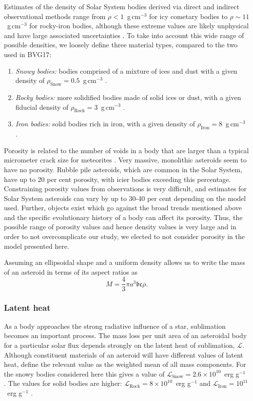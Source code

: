 \documentclass[fleqn,usenatbib]{mnras}
\newcommand{\gcm}{g\,cm$^{-3}$ }	%
\newcommand{\ergg}{erg g$^{-1}$ } %
\begin{document}
Estimates of the density of Solar System bodies derived via direct and indirect observational methods range from $\rho < 1$~\gcm for icy cometary bodies to $\rho \sim 11$~\gcm for rocky-iron bodies, although these extreme values are likely unphysical and have large associated uncertainties \citep{Carry2012}. 
To take into account this wide range of possible densities, we loosely define three material types, compared to the two used in BVG17:
\begin{enumerate}
    \item \textit{Snowy bodies:} bodies comprised of a mixture of ices and dust with a given density of $\rho_\text{Snow} = 0.5$~\gcm.
    \item \textit{Rocky bodies:} more solidified bodies made of solid ices or dust, with a given fiducial density of $\rho_\text{Rock} = 3$~\gcm.
    \item \textit{Iron bodies:} solid bodies rich in iron, with a given density of $\rho_\text{Iron} = 8$~\gcm.
\end{enumerate}

Porosity is related to the number of voids in a body that are larger than a typical micrometer crack size for meteorites \citep{Carry2012}.
Very massive, monolithic asteroids seem to have no porosity. 
Rubble pile asteroids, which are common in the Solar System, have up to 20 per cent porosity, with icier bodies exceeding this percentage. 
Constraining porosity values from observations is very difficult, and estimates for Solar System asteroids can vary by up to 30-40 per cent depending on the model used. 
Further, objects exist which go against the broad trends mentioned above and the specific evolutionary history of a body can affect its porosity.
Thus, the possible range of porosity values and hence density values is very large and in order to not overcomplicate our study, we elected to not consider porosity in the model presented here.


Assuming an ellipsoidal shape and a uniform density allows us to write the mass of an asteroid in terms of its aspect ratios as 
\begin{equation}
    \label{eq:asteroid_mass}
    M = \frac{4}{3} \pi a^3 \mathfrak{b} \mathfrak{c} \rho.
\end{equation}

\subsubsection{Latent heat} \label{subsubsec:ast_latentheat}
As a body approaches the strong radiative influence of a star, sublimation becomes an important process. 
The mass loss per unit area of an asteroidal body for a particular solar flux depends strongly on the latent heat of sublimation, $\mathcal{L}$.
Although constituent materials of an asteroid will have different values of latent heat, \cite{Brown2011} define the relevant value as the weighted mean of all mass components.
For the snowy bodies considered here this gives a value of $\mathcal{L}_\text{Snow} = 2.6 \times 10^{10}$~\ergg.
The values for solid bodies are higher: $\mathcal{L}_\text{Rock} = 8 \times 10^{10}$~\ergg and $\mathcal{L}_\text{Iron} = 10^{11}$~\ergg \citep{Chyba1993}.
 
\end{document}
